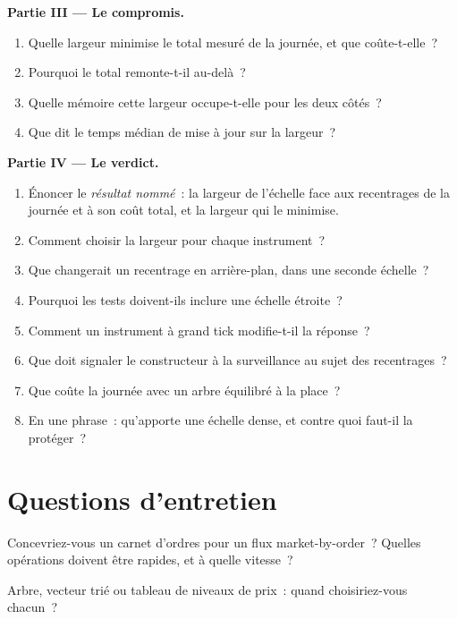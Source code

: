 \begin{problem}
\medskip\noindent\textbf{Partie III --- Le compromis.}
\begin{enumerate}[resume]
\item Quelle largeur minimise le total mesuré de la journée, et que coûte-t-elle~?
\item Pourquoi le total remonte-t-il au-delà~?
\item Quelle mémoire cette largeur occupe-t-elle pour les deux côtés~?
\item Que dit le temps médian de mise à jour sur la largeur~?
\end{enumerate}

\medskip\noindent\textbf{Partie IV --- Le verdict.}
\begin{enumerate}[resume]
\item Énoncer le \emph{résultat nommé}~: la largeur de l'échelle face aux recentrages de la journée et à son coût total, et la largeur qui
le minimise.
\item Comment choisir la largeur pour chaque instrument~?
\item Que changerait un recentrage en arrière-plan, dans une seconde échelle~?
\item Pourquoi les tests doivent-ils inclure une échelle étroite~?
\item Comment un instrument à grand tick modifie-t-il la réponse~?
\item Que doit signaler le constructeur à la surveillance au sujet des recentrages~?
\item Que coûte la journée avec un arbre équilibré à la place~?
\item En une phrase~: qu'apporte une échelle dense, et contre quoi faut-il la protéger~?
\end{enumerate}
\end{problem}

\section{Questions d'entretien}

\begin{interviewq}\label{iq:ll:the-order-book-builder:1}
Concevriez-vous un carnet d'ordres pour un flux market-by-order~? Quelles opérations doivent être rapides, et à quelle vitesse~?
\end{interviewq}

\begin{interviewq}\label{iq:ll:the-order-book-builder:2}
Arbre, vecteur trié ou tableau de niveaux de prix~: quand choisiriez-vous chacun~?
\end{interviewq}


